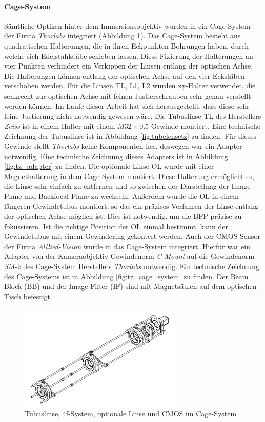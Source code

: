 \documentclass[titlepage]{article}
\begin{document}
	\paragraph{Cage-System}
	Sämtliche Optiken hinter dem Immersionsobjektiv wurden in ein Cage-System der Firma \textit{Thorlabs} integriert (Abbildung \ref{fig:cage_system}). Das Cage-System besteht aus quadratischen Halterungen, die in ihren Eckpunkten Bohrungen haben, durch welche sich Edelstahlstäbe schieben lassen. Diese Fixierung der Halterungen an vier Punkten verhindert ein Verkippen der Linsen entlang der optischen Achse. Die Halterungen können entlang der optischen Achse auf den vier Eckstäben verschoben werden. Für die  Linsen TL, L1, L2 wurden xy-Halter verwendet, die senkrecht zur optischen Achse mit feinen Justierschrauben sehr genau verstellt werden können. Im Laufe dieser Arbeit hat sich herausgestellt, dass diese sehr feine Justierung nicht notwendig gewesen wäre. Die Tubuslinse TL des Herstellers \textit{Zeiss} ist in einem Halter mit einem $M32\times0.5$ Gewinde montiert. Eine technische Zeichnung der Tubuslinse ist in Abbildung \ref{fig:tubelensetz} zu finden. Für dieses Gewinde stellt \textit{Thorlabs} keine Komponenten her, deswegen war ein Adapter notwendig. Eine technische Zeichnung dieses Adapters ist in Abbildung \ref{fig:tz_adapter} zu finden. Die optionale Linse OL wurde mit einer Magnethalterung in dem Cage-System montiert. Diese Halterung ermöglicht es, die Linse sehr einfach zu entfernen und so zwischen der Darstellung der Image-Plane und Backfocal-Plane zu wechseln. Außerdem wurde die OL in einem längeren Gewindetubus montiert, so das ein präzises Verfahren der Linse entlang der optischen Achse möglich ist. Dies ist notwendig, um die BFP präzise zu fokussieren. Ist die richtige Position der OL einmal bestimmt, kann der Gewindetubus mit einem Gewindering gekontert werden. Auch der CMOS-Sensor der Firma \textit{Alllied-Vision} wurde in das Cage-System integriert. Hierfür war ein Adapter von der Kameraobjektiv-Gewindenorm \textit{C-Mount} auf die Gewindenorm \textit{SM-2} des Cage-System Herstellers \textit{Thorlabs} notwendig. Ein technische Zeichnung des Cage-Systems ist in Abbildung \ref{fig:tz_cage_system} zu finden. Der Beam Block (BB) und der Image Filter (IF) sind mit Magnetsäulen auf dem optischen Tisch befestigt.
	\begin{figure}[htbp] 
		\centering
		\includegraphics[width=0.7\textwidth]{figures/Cage_System.pdf}
		\caption[Cage-System]{Tubuslinse, 4f-System, optionale Linse und CMOS im Cage-System}
		\label{fig:cage_system}
	\end{figure}	
\end{document}
